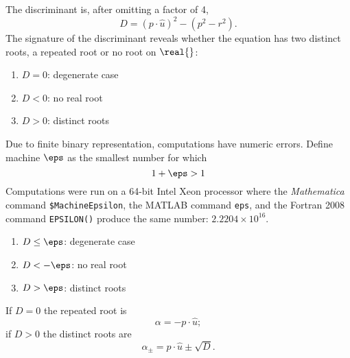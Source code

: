 The discriminant is, after omitting a factor of 4,
%
\begin{equation}
  D = (p\cdot \hat{u})^{2} - (p^{2} - r^{2}).
\end{equation}
%
The signature of the discriminant reveals whether the equation has two distinct roots, a repeated root or no root on $\real{}$:
%
\begin{enumerate}
\item $D = 0$: degenerate case
\item $D < 0$: no real root
\item $D > 0$: distinct roots
\end{enumerate}
%
Due to finite binary representation, computations have numeric errors. Define machine $\eps$ as the smallest number for which
%
\begin{equation}
  1 + \eps > 1
\end{equation}
%
Computations were run on a 64-bit Intel Xeon processor where the \emph{Mathematica} command \verb=$MachineEpsilon=, the MATLAB command \verb=eps=, and the Fortran 2008 command \verb=EPSILON()= produce the same number: $2.2204 \times 10^{16}$.
%
\begin{enumerate}
\item $D \le \eps$: degenerate case
\item $D < -\eps$: no real root
\item $D > \eps$: distinct roots
\end{enumerate}
%
If $D=0$ the repeated root is
\begin{equation}
  \alpha = -p \cdot \hat{u};
\end{equation}
if $D>0$ the distinct roots are
\begin{equation}
  \alpha_{\pm} = p \cdot \hat{u} \pm \sqrt{D}.
\end{equation}
%

%
%

\endinput %